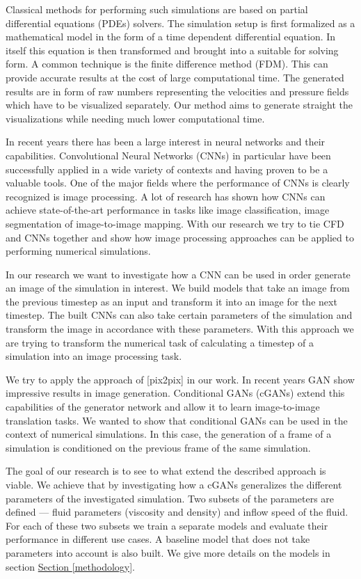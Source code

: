 \documentclass{llncs}
\newcommand{\refsec}[1]{\hyperref[#1]{Section \ref*{#1}}}
\begin{document}
Classical methods for performing such simulations are based on partial differential equations (PDEs) solvers. The simulation setup is first formalized as a mathematical model in the form of a time dependent differential equation. In itself this equation is then transformed and brought into a suitable for solving form. A common technique is the finite difference method (FDM). This can provide accurate results at the cost of large computational time. The generated results are in form of raw numbers representing the velocities and pressure fields which have to be visualized separately. Our method aims to generate straight the visualizations while needing much lower computational time.

In recent years there has been a large interest in neural networks and their capabilities. Convolutional Neural Networks (CNNs) in particular have been successfully applied in a wide variety of contexts and having proven to be a valuable tools. One of the major fields where the performance of CNNs is clearly recognized is image processing. A lot of research has shown how CNNs can achieve state-of-the-art performance in tasks like image classification, image segmentation of image-to-image mapping. With our research we try to tie CFD and CNNs together and show how image processing approaches can be applied to performing numerical simulations.

In our research we want to investigate how a CNN can be used in order generate an image of the simulation in interest. We build models that take an image from the previous timestep as an input and transform it into an image for the next timestep. The built CNNs can also take certain parameters of the simulation and transform the image in accordance with these parameters. With this approach we are trying to transform the numerical task of calculating a timestep of a simulation into an image processing task.

We try to apply the approach of [pix2pix] in our work. In recent years GAN show impressive results in image generation. Conditional GANs (cGANs) extend this capabilities of the generator network and allow it to learn image-to-image translation tasks. We wanted to show that conditional GANs can be used in the context of numerical simulations. In this case, the generation of a frame of a simulation is conditioned on the previous frame of the same simulation.

The goal of our research is to see to what extend the described approach is viable. We achieve that by investigating how a cGANs generalizes the different parameters of the investigated simulation. Two subsets of the parameters are defined --- fluid parameters (viscosity and density) and inflow speed of the fluid. For each of these two subsets we train a separate models and evaluate their performance in different use cases. A baseline model that does not take parameters into account is also built. We give more details on the models in section \refsec{methodology}.
\end{document}
